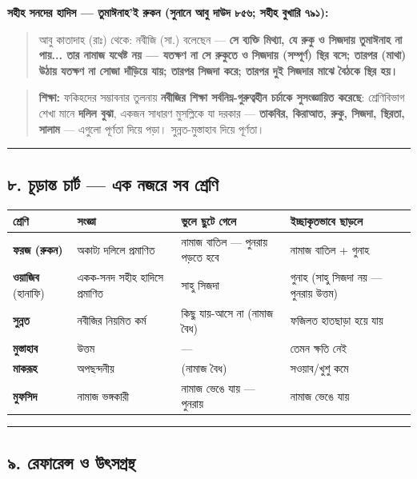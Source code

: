 \textbf{সহীহ সনদের হাদিস — তুমাঈনাহ'ই রুকন (সুনানে আবু দাউদ ৮৫৬; সহীহ বুখারি ৭৯১):}

\begin{quote}
আবু কাতাদাহ (রাঃ) থেকে: নবীজি (সা.) বলেছেন — \textbf{সে ব্যক্তি মিথ্যা, যে রুকু ও সিজদায় তুমাঈনাহ না পায়... তার নামাজ যথেষ্ট নয় — যতক্ষণ না সে রুকুতে ও সিজদায় (সম্পূর্ণ) স্থির বসে; তারপর (মাথা) উঠায় যতক্ষণ না সোজা দাঁড়িয়ে যায়; তারপর সিজদা করে; তারপর দুই সিজদার মাঝে বৈঠকে স্থির হয়।}
\end{quote}

\begin{quote}
\textbf{শিক্ষা:} ফকিহদের সম্ভাবনার তুলনায় \textbf{নবীজির শিক্ষা সর্বনিম্ন-গুরুত্বহীন চর্চাকে সুসংজ্ঞায়িত করেছে}: শ্রেণিবিভাগ শেখা মানে \textbf{দলিল বুঝা}, একজন সাধারণ মুসল্লিকে যা দরকার — \textbf{তাকবির, কিরাআত, রুকু, সিজদা, স্থিরতা, সালাম} — এগুলো পূর্ণতা দিয়ে পড়া। সুন্নত-মুস্তাহাব দিয়ে পূর্ণতা।
\end{quote}

\medskip\hrule\medskip

\subsection*{৮. চূড়ান্ত চার্ট — এক নজরে সব শ্রেণি}

\begin{table}[h]\centering\small
\begin{tabular}{llll}
শ্রেণি & সংজ্ঞা & ভুলে ছুটে গেলে & ইচ্ছাকৃতভাবে ছাড়লে \\
\hline
\textbf{ফরজ (রুকন)} & অকাট্য দলিলে প্রমাণিত & নামাজ বাতিল — পুনরায় পড়তে হবে & নামাজ বাতিল + গুনাহ \\
\textbf{ওয়াজিব} (হানাফি) & একক-সনদ সহীহ হাদিসে প্রমাণিত & সাহু সিজদা & গুনাহ (সাহু সিজদা নয় — পুনরায় উত্তম) \\
\textbf{সুন্নত} & নবীজির নিয়মিত কর্ম & কিছু যায়-আসে না (নামাজ বৈধ) & ফজিলত হাতছাড়া হয়ে যায় \\
\textbf{মুস্তাহাব} & উত্তম & — & তেমন ক্ষতি নেই \\
\textbf{মাকরূহ} & অপছন্দনীয় & (নামাজ বৈধ) & সওয়াব/খুশু কমে \\
\textbf{মুফসিদ} & নামাজ ভঙ্গকারী & নামাজ ভেঙে যায় — পুনরায় & নামাজ ভেঙে যায় \\
\hline
\end{tabular}
\end{table}

\medskip\hrule\medskip

\subsection*{৯. রেফারেন্স ও উৎসগ্রন্থ}

